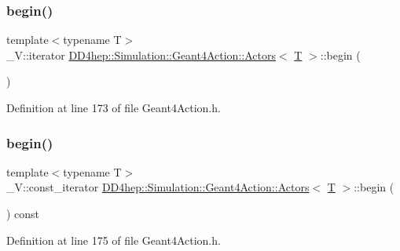 \subsubsection{\texorpdfstring{begin()}{begin()}\hspace{0.1cm}{\footnotesize\ttfamily [1/2]}}
{\footnotesize\ttfamily template$<$typename T$>$ \\
\+\_\+\+V\+::iterator \hyperlink{class_d_d4hep_1_1_simulation_1_1_geant4_action_1_1_actors}{D\+D4hep\+::\+Simulation\+::\+Geant4\+Action\+::\+Actors}$<$ \hyperlink{class_t}{T} $>$\+::begin (\begin{DoxyParamCaption}{ }\end{DoxyParamCaption})\hspace{0.3cm}{\ttfamily [inline]}}



Definition at line 173 of file Geant4\+Action.\+h.

\hypertarget{class_d_d4hep_1_1_simulation_1_1_geant4_action_1_1_actors_a878a3d06a58cee254895ee77039baecf}{}\label{class_d_d4hep_1_1_simulation_1_1_geant4_action_1_1_actors_a878a3d06a58cee254895ee77039baecf} 
\subsubsection{\texorpdfstring{begin()}{begin()}\hspace{0.1cm}{\footnotesize\ttfamily [2/2]}}
{\footnotesize\ttfamily template$<$typename T$>$ \\
\+\_\+\+V\+::const\+\_\+iterator \hyperlink{class_d_d4hep_1_1_simulation_1_1_geant4_action_1_1_actors}{D\+D4hep\+::\+Simulation\+::\+Geant4\+Action\+::\+Actors}$<$ \hyperlink{class_t}{T} $>$\+::begin (\begin{DoxyParamCaption}{ }\end{DoxyParamCaption}) const\hspace{0.3cm}{\ttfamily [inline]}}



Definition at line 175 of file Geant4\+Action.\+h.

\hypertarget{class_d_d4hep_1_1_simulation_1_1_geant4_action_1_1_actors_a6f7c4daf69449e916f62cf5767041aa8}{}\label{class_d_d4hep_1_1_simulation_1_1_geant4_action_1_1_actors_a6f7c4daf69449e916f62cf5767041aa8} 
